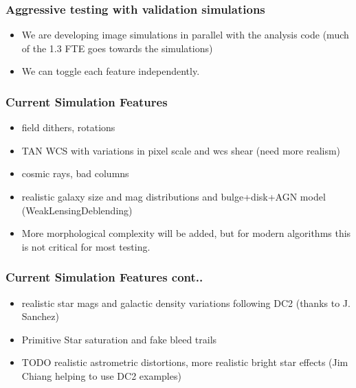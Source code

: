 \documentclass{beamer}
\begin{document}
\frame
{

    \frametitle{Aggressive testing with validation simulations}

    \begin{itemize}

        \item We are developing image simulations in parallel with the analysis
            code (much of the 1.3 FTE goes towards the simulations)

        \item We can toggle each feature independently.

    \end{itemize}

}

\frame
{

    \frametitle{Current Simulation Features}


    \begin{itemize}

                \item field dithers, rotations

                \item TAN WCS with variations in pixel scale and wcs shear (need more realism)

                \item cosmic rays, bad columns

                \item realistic galaxy size and mag distributions and bulge+disk+AGN model
                  (WeakLensingDeblending)

                \item More morphological complexity will be added, but for
                    modern algorithms this is not critical for most testing.

    \end{itemize}
}

\frame
{

    \frametitle{Current Simulation Features cont..}


    \begin{itemize}

        \item realistic star mags and galactic density variations following DC2
            (thanks to J. Sanchez)

        \item Primitive Star saturation and fake bleed trails

        \item TODO realistic astrometric distortions, more realistic bright
            star effects (Jim Chiang helping to use DC2 examples)

    \end{itemize}
}
\end{document}
